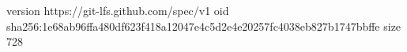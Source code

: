 version https://git-lfs.github.com/spec/v1
oid sha256:1e68ab96ffa480df623f418a12047e4c5d2e4e20257fc4038eb827b1747bbffe
size 728
